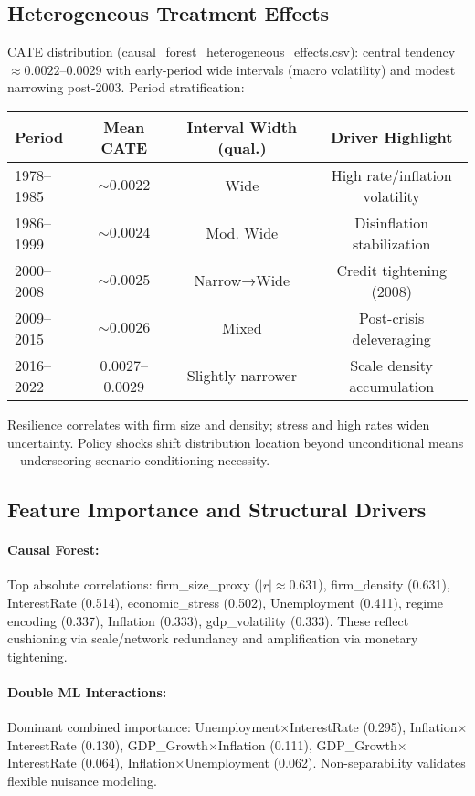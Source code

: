 \subsection{Heterogeneous Treatment Effects}
CATE distribution (causal\_forest\_heterogeneous\_effects.csv): central tendency $\approx 0.0022$--0.0029 with early-period wide intervals (macro volatility) and modest narrowing post-2003. Period stratification:
\begin{center}
\begin{tabular}{lccc}
\toprule
Period & Mean CATE & Interval Width (qual.) & Driver Highlight \\
\midrule
1978--1985 & $\sim 0.0022$ & Wide & High rate/inflation volatility \\
1986--1999 & $\sim 0.0024$ & Mod. Wide & Disinflation stabilization \\
2000--2008 & $\sim 0.0025$ & Narrow→Wide & Credit tightening (2008) \\
2009--2015 & $\sim 0.0026$ & Mixed & Post-crisis deleveraging \\
2016--2022 & $0.0027$--0.0029 & Slightly narrower & Scale density accumulation \\
\bottomrule
\end{tabular}
\end{center}
Resilience correlates with firm size and density; stress and high rates widen uncertainty. Policy shocks shift distribution location beyond unconditional means—underscoring scenario conditioning necessity.

\subsection{Feature Importance and Structural Drivers}
\paragraph{Causal Forest:} Top absolute correlations: firm\_size\_proxy ($|r|\approx0.631$), firm\_density (0.631), InterestRate (0.514), economic\_stress (0.502), Unemployment (0.411), regime encoding (0.337), Inflation (0.333), gdp\_volatility (0.333). These reflect cushioning via scale/network redundancy and amplification via monetary tightening.

\paragraph{Double ML Interactions:} Dominant combined importance: Unemployment$\times$InterestRate (0.295), Inflation$\times$InterestRate (0.130), GDP\_Growth$\times$Inflation (0.111), GDP\_Growth$\times$InterestRate (0.064), Inflation$\times$Unemployment (0.062). Non-separability validates flexible nuisance modeling.

